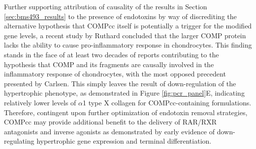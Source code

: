 \begin{refsection}
Further supporting attribution of causality of the results in Section
\ref{sec:bms493_results} to the presence of endotoxins by way of discrediting
the alternative hypothesis that COMPcc itself is potentially a trigger for the
modified gene levels, a recent study by Ruthard  concluded that
the larger COMP protein lacks the ability to cause pro-inflammatory response in
chondrocytes.\cite{Ruthard2014} This finding stands in the face of at least two
decades of reports contributing to the hypothesis that COMP and its fragments
are causally involved in the inflammatory response of
chondrocytes,\cite{Lohmander1994,Vilim1997,Heinegard2011,Adams2001,Vilim2002}
with the most opposed precedent presented by Carlsen.\cite{Carlsen1998}
This simply leaves the result of down-regulation of the hypertrophic phenotype,
as demonstrated in Figure \ref{fig:pcr_panel}E, indicating relatively lower
levels of ${\alpha}$1 type X collagen for COMPcc-containing formulations.
Therefore, contingent upon further optimization of endotoxin removal strategies,
COMPcc may provide additional benefit to the delivery of RAR/RXR
antagonists and inverse agonists as demonstrated by early evidence of
down-regulating hypertrophic gene expression and terminal differentiation.


\end{refsection}
